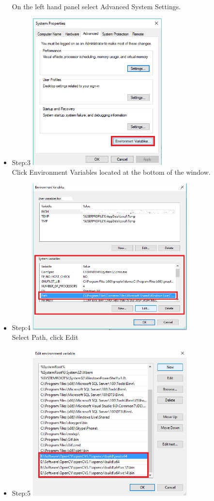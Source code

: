 \documentclass[a4paper,12pt]{report}
\begin{document}
\begin{itemize}
		\linebreak 
		On the left hand panel select Advanced System Settings.
		\item Step:3	\linebreak
		\includegraphics[height=8cm]{../Images/003.png}\\
		\linebreak
		Click Environment Variables located at the bottom of the window.	
		\pagebreak
		\item Step:4	\linebreak
		\includegraphics[height=8cm]{../Images/004.png}\\
		\linebreak
		Select Path, click Edit	
		\item Step:5	\linebreak
		\includegraphics[height=8cm]{../Images/005.png}\\

\end{itemize}
\end{document}
